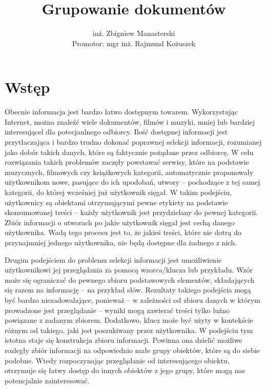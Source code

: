\documentclass{article}
\title{Grupowanie dokumentów}
\author{inż. Zbigniew Manasterski \\[15pt]\footnotesize Promotor: mgr inż. Rajmund Kożuszek}
\begin{document}
\renewcommand{\labelenumii}{\theenumii}
\renewcommand{\theenumii}{\theenumi.\arabic{enumii}.}
\maketitle

\newpage
\tableofcontents
\newpage

\section{Wstęp}
Obecnie informacja jest bardzo łatwo dostępnym towarem. Wykorzystując Internet, można znaleźć wiele dokumentów, filmów i muzyki, mniej lub bardziej interesującel dla potecjanlnego odbiorcy. Ilość dostępnej informacji jest przytłaczająca i bardzo trudno dokonać poprawnej selekcji informacji, rozumianej jako dobór takich danych, które są faktycznie pożądane przez odbiorcę. W celu rozwiązania takich problemów zaczęły powstawać serwisy, które na podstawie muzycznych, filmowych czy książkowych kategorii, automatycznie proponowały użytkownikom nowe, pasujące do ich upodobań, utwory – pochodzące z tej samej kategorii, do której wcześniej już użytkownik sięgał. W takim podejściu, użytkownicy są obiektami otrzymującymi pewne etykiety na podstawie skonsumowanej treści – każdy użytkownik jest przydzielany do pewnej kategorii. Zbiór informacji o utworach po jakie użytkownik sięgał jest cechą danego użytkownika. Wadą tego procesu jest to, że jakieś treści, które nie dotrą do przynajmniej jednego użytkownika, nie będą dostępne dla żadnego z nich.

Drugim podejściem do problemu selekcji informacji jest umożliwienie użytkownikowi jej przeglądania za pomocą wzorca/klucza lub przykładu. Wzór może się ograniczać do pewnego zbioru podstawowych elementów, składających się razem na informację – na przykład słów. Rezultaty takiego podejścia mogą być bardzo niezadowalające, ponieważ – w zależności od zbioru danych w którym prowadzone jest przeglądanie – wyniki mogą zawierać treści tylko luźno powiązane z zadanym zbiorem. Dodatkowo, klucz może być użyty w kontekście różnym od takiego, jaki jest poszukiwany przez użytkownika. W podejściu tym istotna staje się konstrukcja zbioru informacji. Powinna ona dzielić możliwe rozległy zbiór informacji na odpowiednio małe grupy obiektów, które są do siebie podobne. Wtedy rozpoczynając przeglądanie od interesującego obiektu, otrzymuje się łatwy dostęp do innych obiektów z jego grupy, które mogą nas potencjalnie zainteresować.
\end{document}
